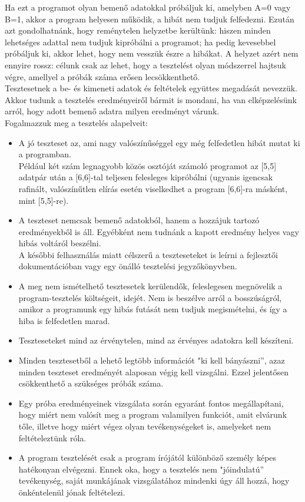 \documentclass[12pt,margin=0px]{article}
\begin{document}
    \noindent Ha ezt a programot olyan bemenő adatokkal próbáljuk ki, amelyben A=0 vagy B=1, akkor a program helyesen működik, a hibát nem tudjuk felfedezni. Ezután azt gondolhatnánk, hogy reménytelen helyzetbe kerültünk: hiszen minden lehetséges adattal nem tudjuk kipróbálni a programot; ha pedig kevesebbel próbáljuk ki, akkor lehet, hogy nem vesszük észre a hibákat. A helyzet azért nem ennyire rossz: célunk csak az lehet, hogy a tesztelést olyan módszerrel hajtsuk végre, amellyel a próbák száma erősen lecsökkenthető.\\
	
    \noindent Tesztesetnek a be- és kimeneti adatok és feltételek együttes megadását nevezzük. Akkor tudunk a tesztelés eredményeiről bármit is mondani, ha van elképzelésünk arról, hogy adott bemenő adatra milyen eredményt várunk.\\
	
	\noindent Fogalmazzuk meg a tesztelés alapelveit:
	\begin{itemize}
		\item 	A jó teszteset az, ami nagy valószínűséggel egy még felfedetlen hibát mutat ki a programban.\\
        Például két szám legnagyobb közös osztóját számoló programot az [5,5] adatpár után a [6,6]-tal teljesen felesleges kipróbálni (ugyanis igencsak rafinált, valószínűtlen elírás esetén viselkedhet a program [6,6]-ra másként, mint [5,5]-re).
        \item 	A teszteset nemcsak bemenő adatokból, hanem a hozzájuk tartozó eredményekből is áll. Egyébként nem tudnánk a kapott eredmény helyes vagy hibás voltáról beszélni.\\
        A későbbi felhasználás miatt célszerű a teszteseteket is leírni a fejlesztői dokumentációban vagy egy önálló tesztelési jegyzőkönyvben.
        \item	A meg nem ismételhető tesztesetek kerülendők, feleslegesen megnövelik a program-tesztelés költségeit, idejét. Nem is beszélve arról a bosszúságról, amikor a programunk egy hibás futását nem tudjuk megismételni, és így a hiba is felfedetlen marad.
        \item	Teszteseteket mind az érvénytelen, mind az érvényes adatokra kell készíteni.
        \item 	Minden tesztesetből a lehető legtöbb információt "ki kell bányászni”, azaz minden teszteset eredményét alaposan végig kell vizsgálni. Ezzel jelentősen csökkenthető a szükséges próbák száma.
        \item	Egy próba eredményeinek vizsgálata során egyaránt fontos megállapítani, hogy miért nem valósít meg a program valamilyen funkciót, amit elvárunk tőle, illetve hogy miért végez olyan tevékenységeket is, amelyeket nem feltételeztünk róla.
        \item	A program tesztelését csak a program írójától különböző személy képes hatékonyan elvégezni. Ennek oka, hogy a tesztelés nem "jóindulatú” tevékenység, saját munkájának vizsgálatához mindenki úgy áll hozzá, hogy önkéntelenül jónak feltételezi.
	\end{itemize}
	
\end{document}
